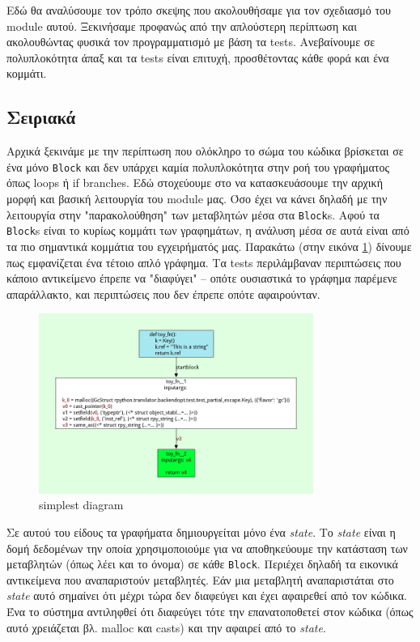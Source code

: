 Εδώ θα αναλύσουμε τον τρόπο σκεψης που ακολουθήσαμε για τον σχεδιασμό του module
αυτού. Ξεκινήσαμε προφανώς από την απλούστερη περίπτωση και ακολουθώντας φυσικά
τον προγραμματισμό με βάση τα tests. Ανεβαίνουμε σε πολυπλοκότητα άπαξ και τα
tests είναι επιτυχή, προσθέτοντας κάθε φορά και ένα κομμάτι.

\subsection{Σειριακά}

Αρχικά ξεκινάμε με την περίπτωση που ολόκληρο το σώμα του κώδικα βρίσκεται σε
ένα μόνο \texttt{Block} και δεν υπάρχει καμία πολυπλοκότητα στην ροή του
γραφήματος όπως loops ή if branches. Εδώ στοχεύουμε στο να κατασκευάσουμε την
αρχική μορφή και βασική λειτουργία του module μας. Όσο έχει να κάνει δηλαδή με
την λειτουργία στην "παρακολούθηση" των μεταβλητών μέσα στα \texttt{Block}s.
Αφού τα \texttt{Block}s είναι το κυρίως κομμάτι των γραφημάτων, η ανάλυση μέσα
σε αυτά είναι από τα πιο σημαντικά κομμάτια του εγχειρήματός μας. Παρακάτω (στην
εικόνα \ref{figure-4}) δίνουμε πως εμφανίζεται ένα τέτοιο απλό γράφημα. Τα tests
περιλάμβαναν περιπτώσεις που κάποιο αντικείμενο έπρεπε να "διαφύγει" – οπότε
ουσιαστικά το γράφημα παρέμενε απαράλλακτο, και περιπτώσεις που δεν έπρεπε οπότε
αφαιρούνταν.

\begin{figure}[h]
\centering
\includegraphics[width=0.8\textwidth]{simplest-func.png}
\caption{simplest diagram}
\label{figure-4}
\end{figure}

Σε αυτού του είδους τα γραφήματα δημιουργείται μόνο ένα \textit{state}. Το
\textit{state} είναι η δομή δεδομένων την οποία χρησιμοποιούμε για να
αποθηκεύουμε την κατάσταση των μεταβλητών (όπως λέει και το όνομα) σε κάθε
\texttt{Block}. Περιέχει δηλαδή τα εικονικά αντικείμενα που αναπαριστούν
μεταβλητές. Εάν μια μεταβλητή αναπαριστάται στο \textit{state} αυτό σημαίνει ότι
μέχρι τώρα δεν διαφεύγει και έχει αφαιρεθεί από τον κώδικα. Ένα το σύστημα
αντιληφθεί ότι διαφεύγει τότε την επανατοποθετεί στον κώδικα  (όπως αυτό
χρειάζεται βλ. malloc και casts) και την αφαιρεί από το \textit{state}.

